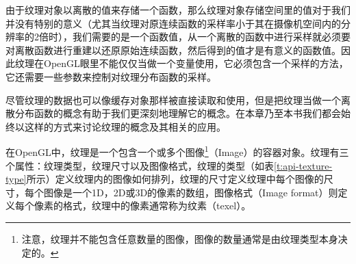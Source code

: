 由于纹理对象以离散的值来存储一个函数，那么纹理对象存储空间里的值对于我们并没有特别的意义（尤其当纹理对原连续函数的采样率小于其在摄像机空间内的分辨率的2倍时），我们需要的是一个函数值，从一个离散的函数中进行采样就必须要对离散函数进行重建以还原原始连续函数，然后得到的值才是有意义的函数值。因此纹理在OpenGL眼里不能仅仅当做一个变量使用，它必须包含一个采样的方法，它还需要一些参数来控制对纹理分布函数的采样。

尽管纹理的数据也可以像缓存对象那样被直接读取和使用，但是把纹理当做一个离散分布函数的概念有助于我们更深刻地理解它的概念。在本章乃至本书我们都会始终以这样的方式来讨论纹理的概念及其相关的应用。

在OpenGL中，纹理是一个包含一个或多个图像\footnote{注意，纹理并不能包含任意数量的图像，图像的数量通常是由纹理类型本身决定的。}（Image）的容器对象。纹理有三个属性：纹理类型，纹理尺寸以及图像格式，纹理的类型（如表\ref{t:api-texture-type}所示）定义纹理内的图像如何排列，纹理的尺寸定义纹理中每个图像的尺寸，每个图像是一个1D，2D或3D的像素的数组，图像格式（Image format）则定义每个像素的格式，纹理中的像素通常称为纹素（texel）。

